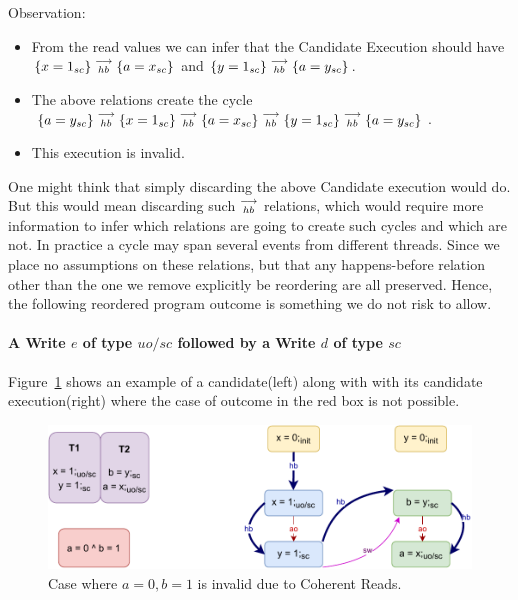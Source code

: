         Observation:
        \begin{itemize}
            \item From the read values we can infer that the Candidate Execution should have $\{x=1_{sc}\}\stackrel{\longrightarrow}{_{hb}}\{a=x_{sc}\}$ and $\{y=1_{sc}\}\stackrel{\longrightarrow}{_{hb}}\{a=y_{sc}\}$.
            \item The above relations create the cycle $\{a=y_{sc}\}\stackrel{\longrightarrow}{_{hb}}\{x=1_{sc}\}\stackrel{\longrightarrow}{_{hb}}\{a=x_{sc}\}\stackrel{\longrightarrow}{_{hb}}\{y=1_{sc}\}\stackrel{\longrightarrow}{_{hb}}\{a=y_{sc}\}$.
            \item This execution is invalid. 
        \end{itemize}

        One might think that simply discarding the above Candidate execution would do. 
        But this would mean discarding such $\stackrel{\longrightarrow}{_{hb}}$ relations, which would require more information to infer which relations are going to create such cycles and which are not. 
        In practice a cycle may span several events from different threads.
        Since we place no assumptions on these relations, but that any happens-before relation other than the one we remove explicitly be reordering are all preserved. 
        Hence, the following reordered program outcome is something we do not risk to allow.


    \paragraph{A Write $e$ of type $uo/sc$ followed by a Write $d$ of type $sc$}
        
        Figure~\ref{reord_counter:example4(a)} shows an example of a candidate(left) along with with its candidate execution(right) where the case of outcome in the red box is not possible. 
        \begin{figure}[H]
            \centering
            \includegraphics[scale=0.7]{4.InstructionReordering/4.ValidReorderingCandidate/Example7(Wuo,sc-Wsc).pdf}
            \caption{Case where $a = 0, b = 1$ is invalid due to Coherent Reads.}
            \label{reord_counter:example4(a)}
        \end{figure}
        
